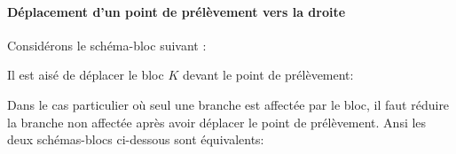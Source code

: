 \paragraph{Déplacement d'un point de prélèvement vers la droite}

Considérons le schéma-bloc suivant :
\begin{center}
\end{center}
Il est aisé de déplacer le bloc $K$ devant le point de prélèvement:  
\begin{center}
\end{center}

Dans le cas particulier où seul une branche est affectée par le bloc, 
il faut réduire la branche non affectée après avoir déplacer le point 
de prélèvement. Ansi les deux schémas-blocs ci-dessous sont équivalents:

